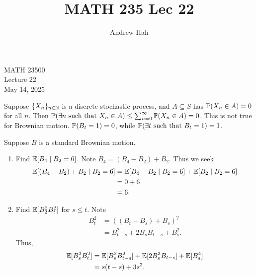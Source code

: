 \documentclass[11pt]{article}
\title{MATH 235 Lec 22}
\author{Andrew Hah}
\begin{document}
\pagestyle{plain}
\begin{center}
{\Large MATH 23500} \\
{\Large Lecture 22} \\
\vspace{.2in}
May 14, 2025
\end{center}

\begin{remark} Suppose $\{ X_n \}_{n \in \mathbb{N}}$ is a discrete stochastic process, and $A \subseteq S$ has $\mathbb{P} (X_n \in A) = 0$ for all $n$. Then $\mathbb{P} (\exists n \text{ such that } X_n \in A) \le \sum_{n = 0}^{\infty} \mathbb{P} (X_n \in A) = 0$. This is not true for Brownian motion. $\mathbb{P} (B_t = 1) = 0$, while $\mathbb{P} (\exists t \text{ such that } B_t = 1) = 1$.
\end{remark}

\begin{example} Suppose $B$ is a standard Brownian motion. \begin{enumerate}
    \item Find $\mathbb{E} [B_4 \mid B_2 = 6]$. Note $B_4 = (B_4 - B_2) + B_2$. Thus we seek \begin{align*} \mathbb{E} [(B_4 - B_2) + B_2 \mid B_2 = 6] & = \mathbb{E} [B_4 - B_2 \mid B_2 = 6] + \mathbb{E} [B_2 \mid B_2 = 6] \\ & = 0 + 6 \\ & = 6.
    \end{align*}
    \item Find $\mathbb{E} [B_2^2 B_t^2]$ for $s \le t$. Note \begin{align*} B_t^2 & = ((B_t - B_s) + B_s)^2 \\ & = B_{t - s}^2 + 2B_sB_{t - s} + B_s^2.
    \end{align*} Thus, \begin{align*} \mathbb{E} [B_s^2 B_t^2] & = \mathbb{E} [B_s^2 B_{t - s}^2] + \mathbb{E} [2B_s^3B_{t - s}] + \mathbb{E} [B_s^4] \\ & = s(t - s) + 3s^2.
    \end{align*}
  \end{enumerate}
\end{example}
\end{document}
